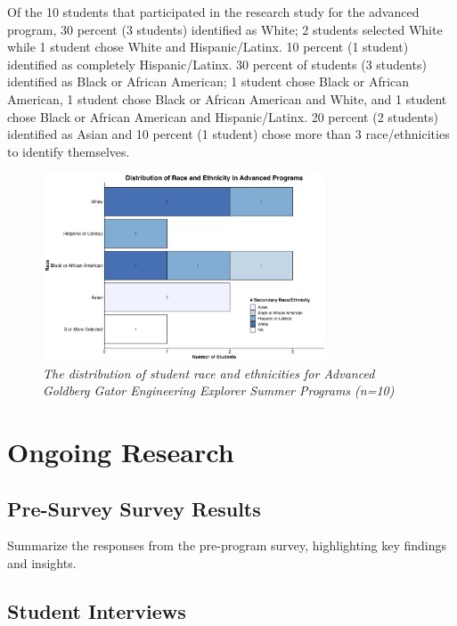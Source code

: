 \documentclass[
]{article}
\begin{document}
Of the 10 students that participated in the research study for the
advanced program, 30 percent (3 students) identified as White; 2
students selected White while 1 student chose White and Hispanic/Latinx.
10 percent (1 student) identified as completely Hispanic/Latinx. 30
percent of students (3 students) identified as Black or African
American; 1 student chose Black or African American, 1 student chose
Black or African American and White, and 1 student chose Black or
African American and Hispanic/Latinx. 20 percent (2 students) identified
as Asian and 10 percent (1 student) chose more than 3 race/ethnicities
to identify themselves.

\begin{figure}
\centering
\includegraphics[width=0.75\textwidth,height=\textheight]{Graphs/Report/GGEE_23_Race_Adv_Num.jpg}
\caption{\emph{The distribution of student race and ethnicities for
Advanced Goldberg Gator Engineering Explorer Summer Programs (n=10)}}
\end{figure}

\hypertarget{ongoing-research}{%
\section{Ongoing Research}\label{ongoing-research}}

\hypertarget{pre-survey-survey-results}{%
\subsection{Pre-Survey Survey Results}\label{pre-survey-survey-results}}

Summarize the responses from the pre-program survey, highlighting key
findings and insights.

\hypertarget{student-interviews}{%
\subsection{Student Interviews}\label{student-interviews}}
\end{document}
